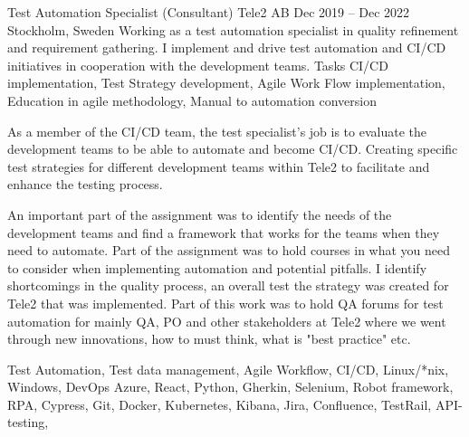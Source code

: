 \documentclass{sobCV}[2015/09/08]
\begin{document}
\experiencenode
   {Test Automation Specialist (Consultant)}
   {Tele2 AB}
   {Dec 2019 -- Dec 2022}
   {Stockholm, Sweden}{
       Working as a test automation specialist in quality refinement and
       requirement gathering. I implement and drive test automation and CI/CD
       initiatives in cooperation with the development teams.
   }
   {Tasks}{
      CI/CD implementation,
      Test Strategy development, 
      Agile Work Flow implementation,
      Education in agile methodology,
      Manual to automation conversion
   }{
        {
           As a member of the CI/CD team, the test specialist's job is to
           evaluate the development teams to be able to automate and become
           CI/CD. Creating specific test strategies for different development
           teams within Tele2 to facilitate and enhance the testing process.
       }

        {
           An important part of the assignment was to identify the needs of the
           development teams and find a framework that works for the teams when
           they need to automate. Part of the assignment was to hold courses in
           what you need to consider when implementing automation and potential
           pitfalls.
       }
        {
           I identify shortcomings in the quality process, an overall test
           the strategy was created for Tele2 that was implemented. Part of this
           work was to hold QA forums for test automation for mainly QA, PO and
           other stakeholders at Tele2 where we went through new innovations,
           how to must think, what is "best practice" etc.
       }
   }{
       Test Automation,
       Test data management,
       Agile Workflow, 
       CI/CD, 
       Linux/*nix, 
       Windows, 
       DevOps Azure, 
       React, 
       Python, 
       Gherkin, 
       Selenium, 
       Robot framework,
       RPA,
       Cypress, 
       Git, 
       Docker, 
       Kubernetes, 
       Kibana, 
       Jira, 
       Confluence, 
       TestRail, 
       API-testing, 
   }
   
\end{document}
